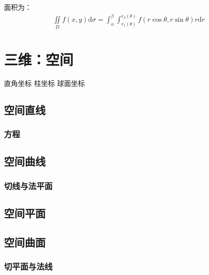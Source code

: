 \documentclass[12pt]{book}
\begin{document}
面积为：
\begin{gather*}
    \iint\limits_{D}{f(x,y)\mathrm{d}\sigma } = \int_{\alpha}^{\beta}\int_{r_{1}(\theta)}^{r_{2}(\theta)}{f(r\cos{\theta},r\sin{\theta})r \mathrm{d}r}
\end{gather*}


\section{三维：空间}





直角坐标 
柱坐标
球面坐标















\subsection{空间直线}



\subsubsection{方程}




\subsection{空间曲线}

\subsubsection{切线与法平面}




\subsection{空间平面}




\subsection{空间曲面}


\subsubsection{切平面与法线}
\end{document}
